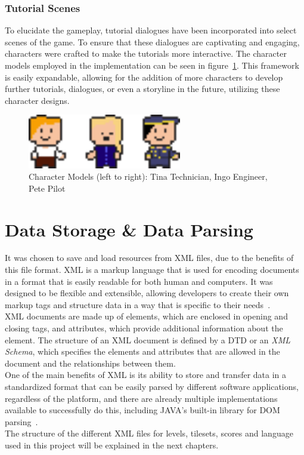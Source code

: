 \subsubsection{Tutorial Scenes}\label{subsubsec:tutorial-scenes}
To elucidate the gameplay, tutorial dialogues have been incorporated into select scenes of the game.
To ensure that these dialogues are captivating and engaging, characters were crafted to make the tutorials more interactive.
The character models employed in the implementation can be seen in figure~\ref{fig:character-models}.
This framework is easily expandable, allowing for the addition of more characters to develop further tutorials,
dialogues, or even a storyline in the future, utilizing these character designs.
\begin{figure}
    \centering
    \includegraphics[width=0.6\textwidth]{Pictures/res/implementation/character-models}
    \caption{Character Models (left to right): Tina Technician, Ingo Engineer, Pete Pilot}
    \label{fig:character-models}
\end{figure}

\section{Data Storage \& Data Parsing}\label{sec:data-storage-&-data-parsing}
It was chosen to save and load resources from \gls{XML} files, due to the benefits of this file format.
\gls{XML} is a markup language that is used for encoding documents in a format that is easily readable for both human and computers.
It was designed to be flexible and extensible, allowing developers to create their own markup tags and structure data in a way that is specific to their needs~\cite{xml}.
\\
\gls{XML} documents are made up of elements, which are enclosed in opening and closing tags, and attributes, which provide additional information about the element.
The structure of an \gls{XML} document is defined by a \gls{DTD} or an \textit{\gls{XML} Schema}, which specifies the elements and attributes that are allowed in the document and the relationships between them.
\\
One of the main benefits of \gls{XML} is its ability to store and transfer data in a standardized format that can be easily parsed by different software applications, regardless of the platform, and there are
already multiple implementations available to successfully do this, including JAVA's built-in library for \gls{DOM} parsing~\cite{dom-parser}.
\\
The structure of the different \gls{XML} files for levels, tilesets, scores and language used in this project will be explained in the next chapters.
